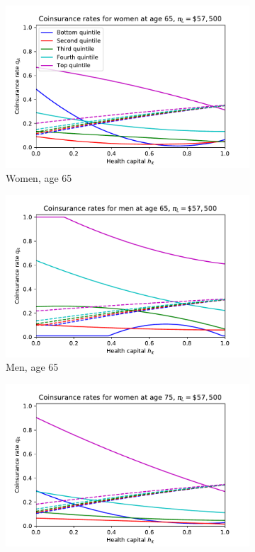 \documentclass[12pt,pdftex,letterpaper]{article}
\begin{document}
\begin{figure}[h!]
    \centering
    \begin{subfigure}[b]{0.49\textwidth}
        \centering
        \includegraphics[width=\textwidth]{../Figures/SocOpt57CopayWomen65.pdf}
        \caption{Women, age 65}
    \end{subfigure}
    \begin{subfigure}[b]{0.49\textwidth}
        \centering
        \includegraphics[width=\textwidth]{../Figures/SocOpt57CopayMen65.pdf}
        \caption{Men, age 65}
    \end{subfigure}
    \begin{subfigure}[b]{0.49\textwidth}
        \centering
        \includegraphics[width=\textwidth]{../Figures/SocOpt57CopayWomen75.pdf}

\end{subfigure}
\end{figure}
\end{document}

